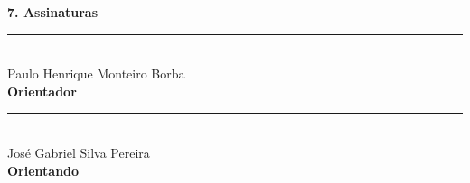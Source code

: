 \begin{flushleft}
	{\textbf{\Large{7. Assinaturas}}}
\end{flushleft}
\vspace{2cm}

\begin{center}
    \rule{0.6\textwidth}{.4pt}\\
    Paulo Henrique Monteiro Borba\\
    \textbf{Orientador}\\
    \vspace{2cm}
    \rule{0.6\textwidth}{.4pt}\\
    José Gabriel Silva Pereira\\
    \textbf{Orientando}
\end{center}
